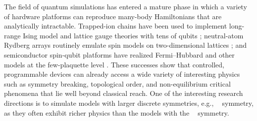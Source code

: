 \documentclass[reprint, aps, prx, amsmath, amssymb, longbibliography, superscriptaddress]{revtex4-2}
\DeclareMathOperator{\Zthree}{\mathbb{Z}_3}
\DeclareMathOperator{\Ztwo}{\mathbb{Z}_2}
\begin{document}
The field of quantum simulations has entered a mature phase in which a variety of hardware platforms can reproduce many-body Hamiltonians that are analytically intractable. Trapped-ion chains have been used to implement long-range Ising model and lattice gauge theories with tens of qubits \cite{tan_domainwall_2021, kyprianidis_observation_2021,brydges_probing_2019,zhang_observation_2017,martinez_realtime_2016,meth_simulating_2025}; neutral-atom Rydberg arrays routinely emulate spin models on two-dimensional lattices \cite{madjarov_highfidelity_2020,semeghini_probing_2021,scholl_quantum_2021,manovitz_quantum_2025,bernien_probing_2017}; and semiconductor spin-qubit platforms have realized Fermi–Hubbard and other models at the few-plaquette level \cite{dehollain_nagaoka_2020, hensgens_quantum_2017, kiczynski_engineering_2022, vandiepen_quantum_2021, wang_experimental_2022, wang_probing_2023}. These successes show that controlled, programmable devices can already access a wide variety of interesting physics such as symmetry breaking, topological order, and non-equilibrium critical phenomena that lie well beyond classical reach. One of the interesting research directions is to simulate models with larger discrete symmetries, e.g., $\Zthree$ symmetry, as they often exhibit richer physics than the models with the $\Ztwo$ symmetry.
\end{document}
